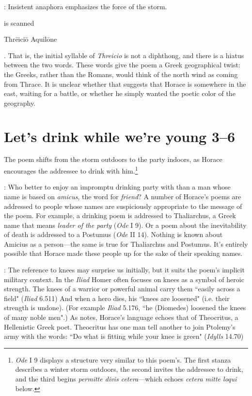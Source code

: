 : Insistent anaphora emphasizes the force of the storm.


 is scanned \begin{metrica}Thr\=e\-ic\-i\=o \-Aqu\-il\=on\-e\end{metrica}.  That is, the initial syllable of \textit{Threicio} is not a diphthong, and there is a hiatus between the two words.  These words give the poem a Greek geographical twist: the Greeks, rather than the Romans, would think of the north wind as coming from Thrace.  It is unclear whether that suggests that Horace is somewhere in the east, waiting for a battle, or whether he simply wanted the poetic color of the geography.


\section*{Let's drink while we're young 3--6}

The poem shifts from the storm outdoors to the party indoors, as Horace encourages the addressee to drink with him.\footnote{\textit{Ode} I 9 displays a structure very similar to this poem's.  The first stanza describes a winter storm outdoors, the second invites the addressee to drink, and the third begins \textit{permitte divis cetera}---which echoes \textit{cetera mitte loqui} below.}


: Who better to enjoy an impromptu drinking party with than a man whose name is based on \textit{amicus}, the word for \textit{friend}?  A number of Horace's poems are addressed to people whose names are suspiciously appropriate to the message of the poem.  For example,  a drinking poem is addressed to Thaliarchus, a Greek name that means \textit{leader of the party} (\textit{Ode} I 9).  Or a poem about the inevitability of death is addressed to a Postumus (\textit{Ode} II 14).  Nothing is known about Amicius as a person---the same is true for Thaliarchus and Postumus.  It's entirely possible that Horace made these people up for the sake of their speaking names.


: The reference to knees may surprise us initially, but it suits the poem's implicit military context.  In the \textit{Iliad} Homer often focuses on knees as a symbol of heroic strength.  The knees of a warrior or powerful animal carry them ``easily across a field" (\textit{Iliad} 6.511)  And when a hero dies, his ``knees are loosened" (i.e. their strength is undone).  (For example \textit{Iliad} 5.176, ``he (Diomedes) loosened the knees of many noble men".)  As \citet[216--217]{mankin1995} notes, Horace's language echoes that of Theocritus, a Hellenistic Greek poet. Theocritus has one man tell another to join Ptolemy's army with the words: ``Do what is fitting while your knee is green" (\textit{Idylls} 14.70)

